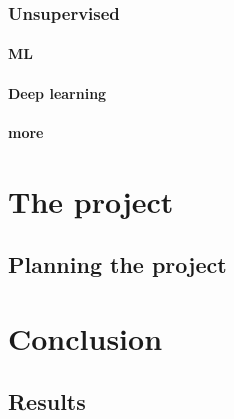 \documentclass[a4paper,english]{ifimaster}
\begin{document}
	\section{Unsupervised}
		\subsection{ML}
		\subsection{Deep learning}
		\subsection{more}
		
\part{The project}

\chapter{Planning the project}

\part{Conclusion}

\chapter{Results}

\backmatter{}

\printbibliography
\end{document}
